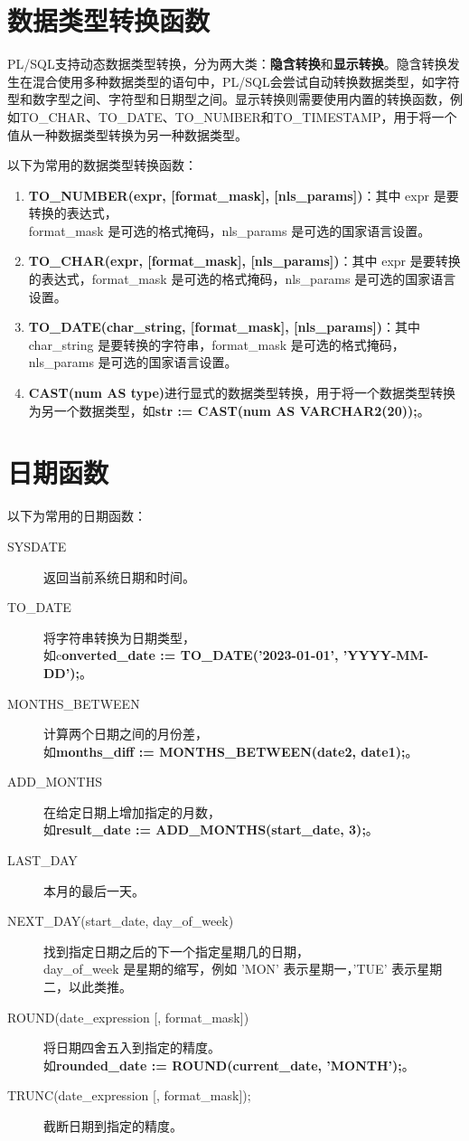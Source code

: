 \documentclass[11pt, a4paper, oneside, UTF8]{ctexbook}
\let\kaishu\relax %
\begin{document}
\section{数据类型转换函数}

PL/SQL支持动态数据类型转换，分为两大类：{\bfseries\kaishu 隐含转换}和{\bfseries\kaishu 显示转换}。隐含转换发生在混合使用多种数据类型的语句中，PL/SQL会尝试自动转换数据类型，如字符型和数字型之间、字符型和日期型之间。显示转换则需要使用内置的转换函数，例如TO\_CHAR、TO\_DATE、TO\_NUMBER和TO\_TIMESTAMP，用于将一个值从一种数据类型转换为另一种数据类型。

以下为常用的数据类型转换函数：
\begin{enumerate}
  \item {\bfseries\kaishu TO\_NUMBER(expr, [format\_mask], [nls\_params])}：其中 expr 是要转换的表达式，\\format\_mask 是可选的格式掩码，nls\_params 是可选的国家语言设置。
  \item {\bfseries\kaishu TO\_CHAR(expr, [format\_mask], [nls\_params])}：其中 expr 是要转换的表达式，format\_mask 是可选的格式掩码，nls\_params 是可选的国家语言设置。
  \item {\bfseries\kaishu TO\_DATE(char\_string, [format\_mask], [nls\_params])}：其中 char\_string 是要转换的字符串，format\_mask 是可选的格式掩码，nls\_params 是可选的国家语言设置。
  \item {\bfseries\kaishu CAST(num AS type)}进行显式的数据类型转换，用于将一个数据类型转换为另一个数据类型，如\textbf{str := CAST(num AS VARCHAR2(20));}。
\end{enumerate}

\section{日期函数}
以下为常用的日期函数：
\begin{description}
  \item[SYSDATE] 返回当前系统日期和时间。
  \item[TO\_DATE] 将字符串转换为日期类型，\\如c{\bfseries\kaishu onverted\_date := TO\_DATE('2023-01-01', 'YYYY-MM-DD');}。
  \item[MONTHS\_BETWEEN] 计算两个日期之间的月份差，\\如\textbf{months\_diff := MONTHS\_BETWEEN(date2, date1);}。
  \item[ADD\_MONTHS] 在给定日期上增加指定的月数，\\如\textbf{result\_date := ADD\_MONTHS(start\_date, 3);}。
  \item[LAST\_DAY] 本月的最后一天。
  \item[NEXT\_DAY(start\_date, day\_of\_week)] 找到指定日期之后的下一个指定星期几的日期，\\day\_of\_week 是星期的缩写，例如 'MON' 表示星期一，'TUE' 表示星期二，以此类推。
  \item[\textup{ROUND(date\_expression [, format\_mask])}] 将日期四舍五入到指定的精度。\\如\textbf{rounded\_date := ROUND(current\_date, 'MONTH');}。
  \item[\textup{TRUNC(date\_expression [, format\_mask]);}] 截断日期到指定的精度。
\end{description}
\end{document}
